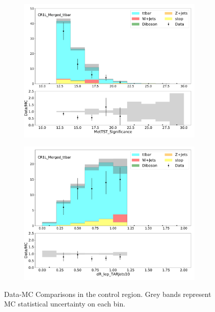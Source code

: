 \begin{figure}[htbp]
\begin{subfigure}{0.49\textwidth}
     \includegraphics[width = 0.98\textwidth]{Figures/4/datamc/CR1L_Merged_ttbar/MetTST_Significance.pdf}
     \caption{\metsig}
     \end{subfigure}
     \begin{subfigure}{0.49\textwidth}
     \includegraphics[width = 0.98\textwidth]{Figures/4/datamc/CR1L_Merged_ttbar/dR_lep_TARJets10.pdf}
     \caption{\drTARl}
     \end{subfigure}
     \caption{Data-MC Comparisons in the \merged \ttbar control region. Grey bands represent MC statistical uncertainty on each bin.}
     \label{fig:Data_MC_CRbV_merged}
  \end{figure}

